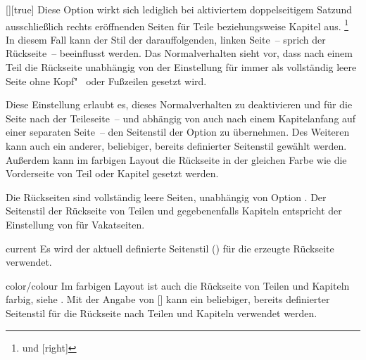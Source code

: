 \begin{Declaration}{[\PSet]}[true]%
\printdeclarationlist%
%
%
%
%
Diese Option wirkt sich lediglich bei aktiviertem doppelseitigem Satzund 
ausschließlich rechts eröffnenden Seiten für Teile beziehungsweise Kapitel
aus.%
\footnote{ und [right]}
In diesem Fall kann der Stil der darauffolgenden, linken Seite~-- sprich der 
Rückseite~-- beeinflusst werden. Das Normalverhalten sieht vor, dass nach einem 
Teil die Rückseite unabhängig von der Einstellung für  
immer als vollständig leere Seite ohne Kopf"~ oder Fußzeilen gesetzt wird.

Diese Einstellung erlaubt es, dieses Normalverhalten zu deaktivieren und für 
die Seite nach der Teileseite~-- und abhängig von  
auch nach einem Kapitelanfang auf einer separaten Seite~-- den Seitenstil der 
Option  zu übernehmen. Des Weiteren kann auch ein 
anderer, beliebiger, bereits definierter Seitenstil gewählt werden. Außerdem
kann im farbigen Layout die Rückseite in der gleichen Farbe wie die 
Vorderseite von Teil oder Kapitel gesetzt werden. \notudscrartcl
%
\begin{values}
\itemfalse
  Die Rückseiten sind vollständig leere Seiten, unabhängig von Option
  .
\itemtrue*
  Der Seitenstil der Rückseite von Teilen und gegebenenfalls Kapiteln 
  entspricht der Einstellung von  für Vakatseiten.
\item[current]
  Es wird der aktuell definierte Seitenstil () für die 
  erzeugte Rückseite verwendet.
\item[color/colour]
  Im farbigen Layout ist auch die Rückseite von Teilen und Kapiteln farbig, 
  siehe .
\makeatletter{}\makeatother
  Mit der Angabe von [] 
  kann ein beliebiger, bereits definierter Seitenstil für die Rückseite nach 
  Teilen und Kapiteln verwendet werden.
\end{values}
\end{Declaration}

